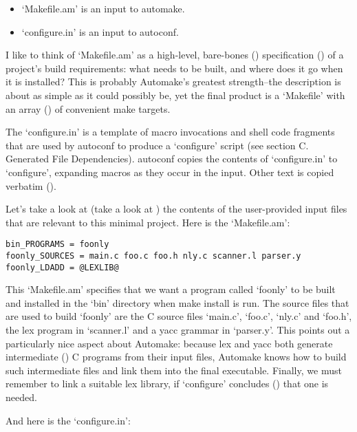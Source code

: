 \begin{itemize}
\item `Makefile.am' is an input to automake. 
\item `configure.in' is an input to autoconf. 
\end{itemize}

I like to think of `Makefile.am' as a high-level, bare-bones ({\MeQ{}})
specification ({\McQ{}}) of a project's build requirements: what needs to be 
built, and where does it go when it is installed? This is probably 
Automake's greatest strength--the description is about as simple as it 
could possibly be, yet the final product is a `Makefile' with an array ({\McQ{}})
of convenient make targets. 


The `configure.in' is a template of macro invocations and shell code 
fragments that are used by autoconf
to produce a `configure' script
(see section C. Generated File Dependencies). autoconf copies the 
contents of `configure.in' to `configure', expanding macros as they 
occur in the input. Other text is copied verbatim ({\MjQ{}}). 


Let's take a look at (take a look at {\MbQ{}}) the contents of the 
user-provided input files that are relevant to this minimal project. Here is the `Makefile.am': 

\begin{Verbatim}[frame=single]
bin_PROGRAMS = foonly
foonly_SOURCES = main.c foo.c foo.h nly.c scanner.l parser.y
foonly_LDADD = @LEXLIB@
\end{Verbatim}


This `Makefile.am' specifies that we want a program called `foonly' to 
be built and installed in the `bin' directory when make install is run.
The source files that are used to build `foonly' are the C source 
files `main.c', `foo.c', `nly.c' and `foo.h', the lex program 
in `scanner.l' and a yacc grammar in `parser.y'. This points out a 
particularly nice aspect about Automake: because lex and yacc both generate 
intermediate ({\MaQ{}}) C programs from their input files, Automake knows how 
to build 
such intermediate files and link them into the final executable. Finally,
we must remember to link a suitable lex library, if `configure' 
concludes ({\McQ{}}) that one is needed. 


And here is the `configure.in': 

